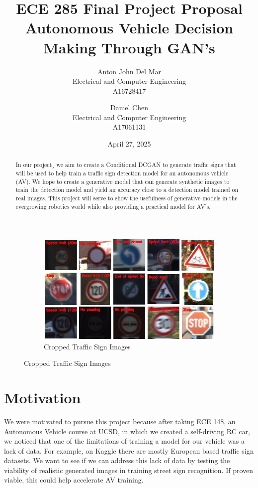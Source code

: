 \documentclass{article}
\title{ECE 285 Final Project Proposal \textendash \@ Autonomous Vehicle Decision Making Through GAN's}
\author{
  Anton John Del Mar \\
  Electrical and Computer Engineering \\
  A16728417 \\
  \and
  Daniel Chen \\
  Electrical and Computer Engineering \\
  A17061131 \\
}
\date{April 27, 2025}
\begin{document}
\maketitle

\begin{abstract} 
    In our project¸ we aim to create a Conditional DCGAN to generate traffic signs that will be used to help train a traffic sign detection model for an autonomous vehicle (AV). We hope to create a generative model that can generate synthetic images to train the detection model and yield an accuracy close to a detection model trained on real images. This project will serve to show the usefulness of generative models in the evergrowing robotics world while also providing a practical model for AV's. 
\end{abstract}

\begin{figure}[h]
    \centering
    \begin{subfigure}{0.4\textwidth}
        \includegraphics[width=\linewidth]{Pictures/traffic_sign_recognition_featured.jpg}
        \caption{Cropped Traffic Sign Images}
    \end{subfigure}
\end{figure}

\section{Motivation}
\qquad We were motivated to pursue this project because after taking ECE 148, an Autonomous Vehicle course at UCSD, in which we created a self-driving RC car, we noticed that one of the limitations of training a model for our vehicle was a lack of data. For example, on Kaggle there are mostly European based traffic sign datasets. We want to see if we can address this lack of data by testing the viability of realistic generated images in training street sign recognition. If proven viable, this could help accelerate AV training.
\end{document}
